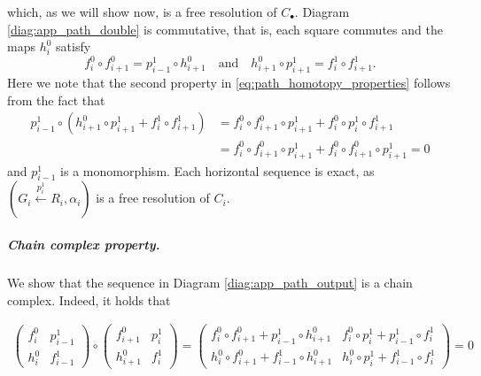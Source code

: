 which, as we will show now, is a free resolution of $C_\bullet$.
%
Diagram \eqref{diag:app_path_double} is commutative, that is, each square commutes and the maps $h^0_i$ satisfy
\begin{equation}
\label{eq:path_homotopy_properties}
    f^0_i \circ f^0_{i+1} = p^1_{i-1} \circ h^0_{i+1} \quad \text{and} \quad h^0_{i+1}\circ p^1_{i+1} = f^1_{i} \circ f^1_{i+1}.
\end{equation}
Here we note that the second property in \eqref{eq:path_homotopy_properties} follows from the fact that
\begin{equation*}
\begin{aligned}
p_{i-1}^1\circ (h^0_{i+1}\circ p^1_{i+1}+f^1_{i} \circ f^1_{i+1})&=f_{i}^0\circ f_{i+1}^0\circ p_{i+1}^1+f_i^0\circ p_i^1\circ f_{i+1}^1 \\ &=f_{i}^0\circ f_{i+1}^0\circ p_{i+1}^1+f_i^0\circ f_{i+1}^0\circ p_{i+1}^1=0
\end{aligned}
\end{equation*}
and $p_{i-1}^1$ is a monomorphism. Each horizontal sequence is exact, as $(G_i\xleftarrow{p^1_i} R_i,\alpha_i)$ is a free resolution of $C_i$. 
%
\subparagraph{Chain complex property.} We show that the sequence in Diagram \eqref{diag:app_path_output} is a chain complex. Indeed, it holds that 
\begin{align*}
\begin{pmatrix}f^0_i & p^1_{i-1} \\ h^0_i & f^1_{i-1} \end{pmatrix}\circ \begin{pmatrix}f^0_{i+1} & p^1_{i} \\ h^0_{i+1} & f^1_{i} \end{pmatrix}=\begin{pmatrix}f^0_{i}\circ f^0_{i+1}+p^1_{i-1}\circ h^0_{i+1} & f^0_i\circ p^1_i+p^1_{i-1}\circ f^1_i \\ h^0_i\circ f^0_{i+1}+f^1_{i-1}\circ h^0_{i+1} & h^0_i\circ p^1_i+f^1_{i-1}\circ f^1_i \end{pmatrix} = 0
\end{align*}
